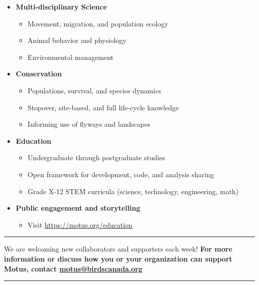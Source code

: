 \documentclass[
]{article}
\providecommand{\tightlist}{%
  \setlength{\itemsep}{0pt}\setlength{\parskip}{0pt}}
\begin{document}
\begin{itemize}
\tightlist
\item
  \textbf{Multi-disciplinary Science}

  \begin{itemize}
  \tightlist
  \item
    Movement, migration, and population ecology
  \item
    Animal behavior and physiology
  \item
    Environmental management
  \end{itemize}
\item
  \textbf{Conservation}

  \begin{itemize}
  \tightlist
  \item
    Populations, survival, and species dynamics
  \item
    Stopover, site-based, and full life-cycle knowledge
  \item
    Informing use of flyways and landscapes
  \end{itemize}
\item
  \textbf{Education}

  \begin{itemize}
  \tightlist
  \item
    Undergraduate through postgraduate studies
  \item
    Open framework for development, code, and analysis sharing
  \item
    Grade X-12 STEM curricula (science, technology, engineering, math)
  \end{itemize}
\item
  \textbf{Public engagement and storytelling}

  \begin{itemize}
  \tightlist
  \item
    Visit \url{https://motus.org/education}
  \end{itemize}
\end{itemize}

\begin{center}\rule{0.5\linewidth}{0.5pt}\end{center}

We are welcoming new collaborators and supporters each week! \textbf{For
more information or discuss how you or your organization can support
Motus, contact \url{motus@birdscanada.org}}

\begin{center}\rule{0.5\linewidth}{0.5pt}\end{center}
\end{document}
